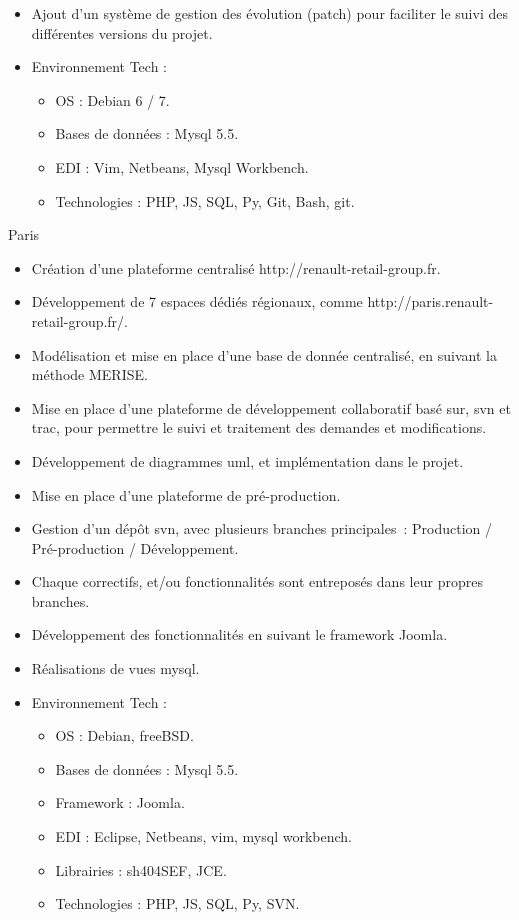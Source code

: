 \documentclass[10pt,a4paper,sans]{moderncv}
\begin{document}
{\begin{itemize}
        \item Ajout d'un système de gestion des évolution (patch) pour faciliter le suivi des différentes versions du projet.
        \item Environnement Tech :
            \begin{itemize}%
                \item OS : Debian 6 / 7.
                \item Bases de données : Mysql 5.5.
                \item EDI : Vim, Netbeans, Mysql Workbench.
                \item Technologies : PHP, JS, SQL, Py, Git, Bash, git.
            \end{itemize}
\end{itemize}}

{Paris}{
    \begin{itemize}%
        \item Création d'une plateforme centralisé http://renault-retail-group.fr.
        \item Développement de 7 espaces dédiés régionaux, comme http://paris.renault-retail-group.fr/.
        \item Modélisation et mise en place d'une base de donnée centralisé, en suivant la méthode MERISE.
        \item Mise en place d'une plateforme de développement collaboratif basé sur, svn et trac, pour permettre le suivi et traitement des demandes et modifications.
        \item Développement de diagrammes uml, et implémentation dans le projet.
        \item Mise en place d'une plateforme de pré-production.
        \item Gestion d'un dépôt svn, avec plusieurs branches principales : Production / Pré-production / Développement.
        \item Chaque correctifs, et/ou fonctionnalités sont entreposés dans leur propres branches.
        \item Développement des fonctionnalités en suivant le framework Joomla.
        \item Réalisations de vues mysql.
        \item Environnement Tech :
            \begin{itemize}%
                \item OS : Debian, freeBSD.
                \item Bases de données : Mysql 5.5.
                \item Framework : Joomla.
                \item EDI : Eclipse, Netbeans, vim, mysql workbench.
                \item Librairies : sh404SEF, JCE.
                \item Technologies : PHP, JS, SQL, Py, SVN.
            \end{itemize}
\end{itemize}}
\end{document}
